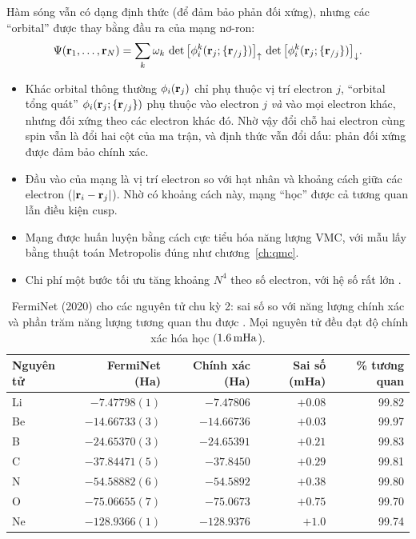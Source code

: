 \begin{congthuc}
Hàm sóng vẫn có dạng định thức (để đảm bảo phản đối xứng), nhưng các ``orbital'' được thay bằng đầu ra của mạng nơ-ron:
\[
\Psi(\mathbf r_1,\ldots,\mathbf r_N)=\sum_{k}\omega_k\,\det\big[\phi^{k}_i(\mathbf r_j;\{\mathbf r_{/j}\})\big]_{\uparrow}\,\det\big[\phi^{k}_i(\mathbf r_j;\{\mathbf r_{/j}\})\big]_{\downarrow} .
\]
\begin{itemize}
\item Khác orbital thông thường $\phi_i(\mathbf r_j)$ chỉ phụ thuộc vị trí electron $j$, ``orbital tổng quát'' $\phi_i(\mathbf r_j;\{\mathbf r_{/j}\})$ phụ thuộc vào electron $j$ \emph{và} vào mọi electron khác, nhưng đối xứng theo các electron khác đó. Nhờ vậy đổi chỗ hai electron cùng spin vẫn là đổi hai cột của ma trận, và định thức vẫn đổi dấu: phản đối xứng được đảm bảo chính xác.
\item Đầu vào của mạng là vị trí electron so với hạt nhân và khoảng cách giữa các electron ($|\mathbf r_i-\mathbf r_j|$). Nhờ có khoảng cách này, mạng ``học'' được cả tương quan lẫn điều kiện cusp.
\item Mạng được huấn luyện bằng cách cực tiểu hóa năng lượng VMC, với mẫu lấy bằng thuật toán Metropolis đúng như chương~\ref{ch:qmc}.
\item Chi phí một bước tối ưu tăng khoảng $N^4$ theo số electron, với hệ số rất lớn \cite{Pfau2020}.
\end{itemize}
\end{congthuc}

\begin{table}[h]
\centering\small
\caption{FermiNet (2020) cho các nguyên tử chu kỳ 2: sai số so với năng lượng chính xác và phần trăm năng lượng tương quan thu được \cite{Pfau2020}. Mọi nguyên tử đều đạt độ chính xác hóa học ($1.6\,\mathrm{mHa}$).}
\label{tab:ferminet}
\begin{tabular}{@{}lrrrr@{}}
\toprule
Nguyên tử & FermiNet (Ha) & Chính xác (Ha) & Sai số (mHa) & \% tương quan \\
\midrule
Li & $-7.47798(1)$ & $-7.47806$ & $+0.08$ & 99.82 \\
Be & $-14.66733(3)$ & $-14.66736$ & $+0.03$ & 99.97 \\
B & $-24.65370(3)$ & $-24.65391$ & $+0.21$ & 99.83 \\
C & $-37.84471(5)$ & $-37.8450$ & $+0.29$ & 99.81 \\
N & $-54.58882(6)$ & $-54.5892$ & $+0.38$ & 99.80 \\
O & $-75.06655(7)$ & $-75.0673$ & $+0.75$ & 99.70 \\
Ne & $-128.9366(1)$ & $-128.9376$ & $+1.0$ & 99.74 \\
\bottomrule
\end{tabular}
\end{table}

